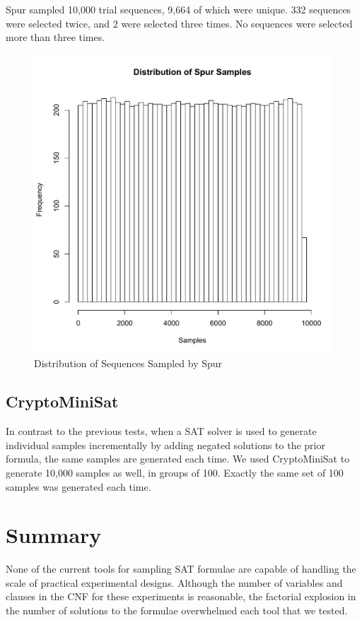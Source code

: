 Spur sampled 10,000 trial sequences, 9,664 of which were unique. 332 sequences were selected twice, and 2 were selected three times. No sequences were selected more than three times.

\begin{figure}
\centering
\centerline{\includegraphics[origin=c,width=12cm]{../figures/spur-samples.pdf}}
\caption{Distribution of Sequences Sampled by Spur}
\label{fig:spur_samples}
\end{figure}


\subsection{CryptoMiniSat}

In contrast to the previous tests, when a SAT solver is used to generate individual samples incrementally by adding negated solutions to the prior formula, the same samples are generated each time. We used CryptoMiniSat to generate 10,000 samples as well, in groups of 100. Exactly the same set of 100 samples was generated each time.


\section{Summary}

None of the current tools for sampling SAT formulae are capable of handling the scale of practical experimental designs. Although the number of variables and clauses in the CNF for these experiments is reasonable, the factorial explosion in the number of solutions to the formulae overwhelmed each tool that we tested.





